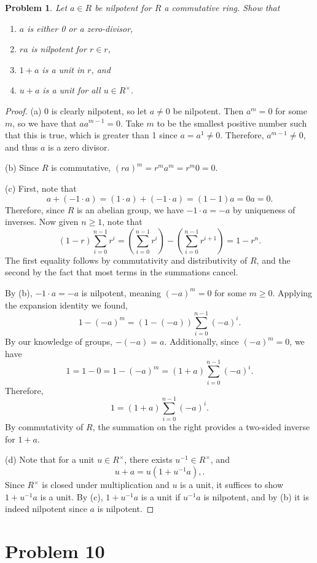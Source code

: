 \documentclass[11pt, letterpaper]{article}
\theoremstyle{plain}
\newtheorem{problem}{Problem}[section]
\begin{document}
\begin{problem}
	Let $a\in R$ be nilpotent for $R$ a commutative ring. Show that
	\begin{enumerate}
		\item $a$ is either 0 or a zero-divisor,
		\item $ra$ is nilpotent for $r\in r$,
		\item $1+a$ is a unit in $r$, and
		\item $u+a$ is a unit for all $u\in R^\times $.
	\end{enumerate}
\end{problem}
\begin{proof}
	(a) 0 is clearly nilpotent, so let $a\neq 0$ be nilpotent. Then $a^m=0$ for some $m$, so we have that $a a^{m-1} =0$. Take $m$ to be the smallest positive number such that this is true, which is greater than 1 since $a=a^1\neq 0$. Therefore, $a^{m-1} \neq 0$, and thus $a$ is a zero divisor.

	(b) Since $R$ is commutative, $(ra)^m=r^ma^m=r^m0=0$.

	(c) First, note that
	\[
		a+(-1\cdot a)=(1\cdot a)+(-1\cdot a)=(1-1)a=0a=0
	.\]
	Therefore, since $R$ is an abelian group, we have $-1\cdot a=-a$ by uniqueness of inverses. Now given $n\geq 1$, note that
	\[
		(1-r)\sum_{i=0}^{n-1} r^i=\left( \sum_{i=0}^{n-1} r^i \right) -\left(\sum_{i=0}^{n-1} r^{i+1} \right)=1-r^n
	.\]
	The first equality follows by commutativity and distributivity of $R$, and the second by the fact that most terms in the summations cancel.

	By (b), $-1\cdot a=-a$ is nilpotent, meaning $(-a)^m=0$ for some $m\geq 0$. Applying the expansion identity we found,
	\[
		1-(-a)^m=(1-(-a))\sum_{i=0}^{n-1} (-a)^i
	.\]
	By our knowledge of groups, $-(-a)=a$. Additionally, since $(-a)^m=0$, we have
	\[
		1=1-0=1-(-a)^m=(1+a)\sum_{i=0}^{n-1} (-a)^i
	.\]
	Therefore,
	\[
		1=(1+a)\sum_{i=0}^{n-1} (-a)^i
	.\]
	By commutativity of $R$, the summation on the right provides a two-sided inverse for $1+a$.

	(d) Note that for a unit $u\in R^\times $, there exists $u^{-1} \in R^\times $, and
	\[
		u+a=u(1+u^{-1} a),
	.\]
	Since $R^\times $ is closed under multiplication and $u$ is a unit, it suffices to show $1+u^{-1} a$ is a unit. By (c), $1+u^{-1} a$ is a unit if $u^{-1} a$ is nilpotent, and by (b) it is indeed nilpotent since $a$ is nilpotent.
\end{proof}

\section{Problem 10}
\end{document}
